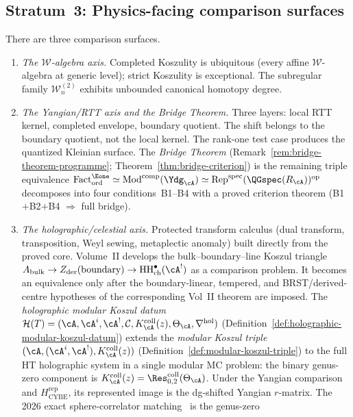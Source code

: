 \subsection*{Stratum~3: Physics-facing comparison surfaces}
There are three comparison surfaces.
\begin{enumerate}
\item \emph{The $\mathcal{W}$-algebra axis.}
 Completed Koszulity is ubiquitous (every affine
 $\mathcal{W}$-algebra at generic level); strict Koszulity is
 exceptional. The subregular family
 $\mathcal{W}_n^{(2)}$ exhibits unbounded canonical homotopy
 degree.
\item \emph{The Yangian/RTT axis and the Bridge Theorem.}
 Three layers: local RTT kernel, completed envelope, boundary
 quotient. The shift belongs to the boundary quotient, not
 the local kernel. The rank-one test case produces the
 quantized Kleinian surface.
 The \emph{Bridge Theorem}
 \textup{(}Remark~\ref{rem:bridge-theorem-programme};
 Theorem~\ref{thm:bridge-criterion}\textup{)}
 is the remaining triple equivalence
 $\mathrm{Fact}^{\Eone}_{\mathrm{ord}} \simeq
 \mathrm{Mod}^{\mathrm{comp}}(\Ydg_\cA) \simeq
 \mathrm{Rep}^{\mathrm{spec}}(\QGspec(R_\cA))^{\mathrm{op}}$
 decomposes into four conditions~B1--B4 with a proved criterion
 theorem (B1$+$B2$+$B4 $\Rightarrow$ full bridge).
\item \emph{The holographic/celestial axis.}
 Protected transform calculus (dual transform, transposition,
 Weyl sewing, metaplectic anomaly) built directly from the
 proved core.
Volume~II develops the bulk--boundary--line Koszul triangle
$A_{\mathrm{bulk}}\to Z_{\mathrm{der}}(\text{boundary})
\to \mathrm{HH}^\bullet_{\mathrm{ch}}(\cA^!)$ as a comparison
problem.  It becomes an equivalence only after the boundary-linear,
tempered, and BRST/derived-centre hypotheses of the corresponding
 Vol~II theorem are imposed.
 The \emph{holographic modular Koszul datum}
 $\mathcal{H}(T) = (\cA,\cA^i,\cA^!,\mathcal{C},
 K_\cA^{\mathrm{coll}}(z),
 \Theta_\cA,\nabla^{\mathrm{hol}})$
 (Definition~\ref{def:holographic-modular-koszul-datum})
 extends the \emph{modular Koszul triple}
 $(\cA,(\cA^i,\cA^!),K_\cA^{\mathrm{coll}}(z))$
 (Definition~\ref{def:modular-koszul-triple})
 to the full HT holographic system in a single modular
 MC problem: the binary genus-zero component is
 $K_\cA^{\mathrm{coll}}(z)
 =\Res^{\mathrm{coll}}_{0,2}(\Theta_\cA)$.  Under the Yangian
 comparison and $H_{\mathrm{CYBE}}^{\mathrm{rep}}$, its represented
 image is the dg-shifted Yangian $r$-matrix.  The 2026
 exact sphere-correlator matching~\cite{GZ26} is the genus-zero

\end{enumerate}
